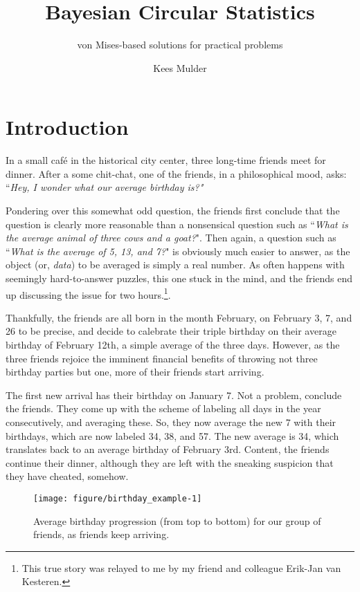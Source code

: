 \documentclass[12pt, a4paper]{book}\usepackage[]{graphicx}\usepackage[]{color}
\title{Bayesian Circular Statistics}
\subtitle{von Mises-based solutions for practical problems}
\author{Kees Mulder}
\makeatletter
\def\maxwidth{ %
  \ifdim\Gin@nat@width>\linewidth
    \linewidth
  \else
    \Gin@nat@width
  \fi
}
\newenvironment{knitrout}{}{} %
\makeatother
\begin{document}
\frontmatter

\maketitle

\tableofcontents



\mainmatter
\chapter{Introduction}
\label{intro}

In a small caf\'e in the historical city center, three long-time friends meet for dinner. After a some chit-chat, one of the friends, in a philosophical mood, asks: ``\textit{Hey, I wonder what our average birthday is?"}

Pondering over this somewhat odd question, the friends first conclude that the question is clearly more reasonable than a nonsensical question such as ``\textit{What is the average animal of three cows and a goat?}". Then again, a question such as ``\textit{What is the average of 5, 13, and 7?}" is obviously much easier to answer, as the object (or, \textit{data}) to be averaged is simply a real number. As often happens with seemingly hard-to-answer puzzles, this one stuck in the mind, and the friends end up discussing the issue for two hours.\footnote{This true story was relayed to me by my friend and colleague Erik-Jan van Kesteren.}.

Thankfully, the friends are all born in the month February, on February 3, 7, and 26 to be precise, and decide to calebrate their triple birthday on their average birthday of February 12th, a simple average of the three days. However, as the three friends rejoice the imminent financial benefits of throwing not three birthday parties but one, more of their friends start arriving.

The first new arrival has their birthday on January 7. Not a problem, conclude the friends. They come up with the scheme of labeling all days in the year consecutively, and averaging these. So, they now average the new 7 with their birthdays, which are now labeled 34, 38, and 57. The new average is 34, which translates back to an average birthday of February 3rd. Content, the friends continue their dinner, although they are left with the sneaking suspicion that they have cheated, somehow.



\begin{figure}
\begin{knitrout}
\color{fgcolor}
\texttt{[image: figure/birthday\_example-1]} 

\end{knitrout}
\caption{Average birthday progression (from top to bottom) for our group of friends, as friends keep arriving.}
\label{birthday_example}
\end{figure}
\end{document}
